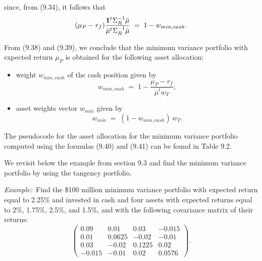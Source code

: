 %

since, from (9.34), it follows that
\[
(\mu_P-r_f)\frac{\mathbf{1}^t\Sigma_R^{-1}\bar\mu}{\bar\mu^t\Sigma_R^{-1}\bar\mu} \;=\;
1-w_{min,cash}.
\]

From (9.38) and (9.39), we conclude that the minimum variance portfolio with expected
return $\mu_P$ is obtained for the following asset allocation:
\begin{itemize}
\item weight $w_{min,cash}$ of the cash position given by
\begin{equation}
w_{min,cash} \;=\; 1-\frac{\mu_P-r_f}{\bar\mu^tw_T};
\end{equation}
\item asset weights vector $w_{min}$ given by
\begin{equation}
w_{min} \;=\; (1-w_{min,cash})\,w_T.
\end{equation}
\end{itemize}

The pseudocode for the asset allocation for the minimum variance portfolio computed
using the formulas (9.40) and (9.41) can be found in Table 9.2.

We revisit below the example from section 9.3 and find the minimum variance portfolio
by using the tangency portfolio.

\par\medskip\noindent\textit{Example:}\ Find the \$100 million minimum variance
portfolio with expected return equal to 2.25\% and invested in cash and four assets
with expected returns equal to 2\%, 1.75\%, 2.5\%, and 1.5\%, and with the following
covariance matrix of their returns:
\[
\begin{pmatrix}
0.09 & 0.01 & 0.03 & -0.015 \\
0.01 & 0.0625 & -0.02 & -0.01 \\
0.03 & -0.02 & 0.1225 & 0.02 \\
-0.015 & -0.01 & 0.02 & 0.0576
\end{pmatrix}.
\]


